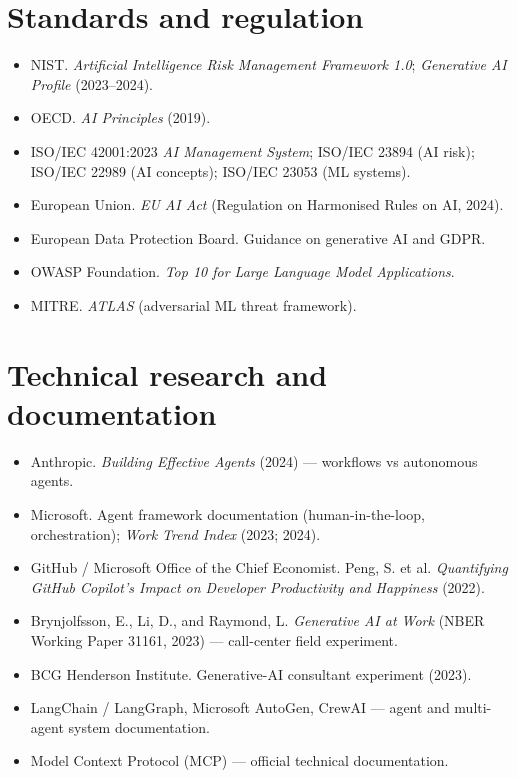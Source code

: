 \section{Standards and regulation}

\begin{itemize}
  \item NIST. \textit{Artificial Intelligence Risk Management Framework 1.0};
        \textit{Generative AI Profile} (2023--2024).
  \item OECD. \textit{AI Principles} (2019).
  \item ISO/IEC 42001:2023 \textit{AI Management System}; ISO/IEC 23894
        (AI risk); ISO/IEC 22989 (AI concepts); ISO/IEC 23053 (ML systems).
  \item European Union. \textit{EU AI Act} (Regulation on Harmonised Rules on
        AI, 2024).
  \item European Data Protection Board. Guidance on generative AI and GDPR.
  \item OWASP Foundation. \textit{Top 10 for Large Language Model
        Applications}.
  \item MITRE. \textit{ATLAS} (adversarial ML threat framework).
\end{itemize}

\section{Technical research and documentation}

\begin{itemize}
  \item Anthropic. \textit{Building Effective Agents} (2024) — workflows vs
        autonomous agents.
  \item Microsoft. Agent framework documentation (human-in-the-loop,
        orchestration); \textit{Work Trend Index} (2023; 2024).
  \item GitHub / Microsoft Office of the Chief Economist. Peng, S. et al.
        \textit{Quantifying GitHub Copilot's Impact on Developer Productivity
        and Happiness} (2022).
  \item Brynjolfsson, E., Li, D., and Raymond, L. \textit{Generative AI at
        Work} (NBER Working Paper 31161, 2023) — call-center field experiment.
  \item BCG Henderson Institute. Generative-AI consultant experiment (2023).
  \item LangChain / LangGraph, Microsoft AutoGen, CrewAI — agent and
        multi-agent system documentation.
  \item Model Context Protocol (MCP) — official technical documentation.
\end{itemize}

